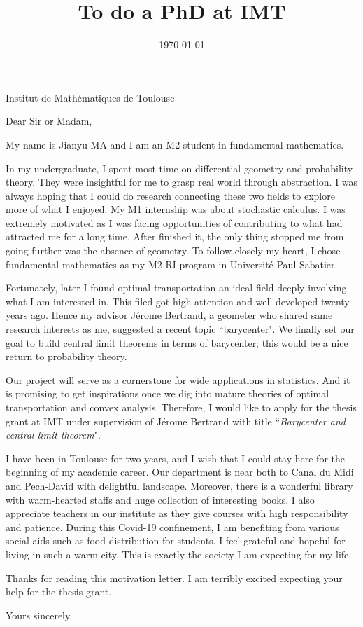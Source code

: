 \documentclass[11pt]{letter}
\title{To do a PhD at IMT}
\date{\today}
\begin{document}
\begin{letter}{Institut de Mathématiques de Toulouse}
	\opening{Dear Sir or Madam,}

	\setlength\parindent{1em}
	My name is Jianyu MA and I am an M2 student in fundamental mathematics.

	In my undergraduate, I spent most time on differential geometry and probability theory. They were insightful for me to grasp real world through abstraction. I was always hoping that I could do research connecting these two fields to explore more of what I enjoyed. My M1 internship was about stochastic calculus.
	I was extremely motivated as I was facing opportunities of contributing to what had attracted me for a long time.
	After finished it, the only thing stopped me from going further was the absence of geometry.
	To follow closely my heart, I chose fundamental mathematics as my M2 RI program in Université Paul Sabatier.

	Fortunately, later I found optimal transportation an ideal field deeply involving what I am interested in. This filed got high attention and well developed twenty years ago. Hence my advisor Jérome Bertrand, a geometer who shared same research interests as me, suggested a recent topic ``barycenter".
	We finally set our goal to build central limit theorems in terms of barycenter; this would be a nice return to probability theory.

	Our project will serve as a cornerstone for wide applications in statistics. And it is promising to get inspirations once we dig into mature theories of optimal transportation and convex analysis. Therefore, I would like to apply for the thesis grant at IMT under supervision of Jérome Bertrand with title ``\emph{Barycenter and central limit theorem}".

	I have been in Toulouse for two years, and I wish that I could stay here for the beginning of my academic career.
	Our department is near both to Canal du Midi and Pech-David with delightful landscape.
	Moreover, there is a wonderful library with  warm-hearted staffs and huge collection of interesting books.
	I also appreciate teachers in our institute as they give courses with high responsibility and patience.
	During this Covid-19 confinement, I am benefiting from various social aids such as food distribution for students.
	I feel grateful and hopeful for living in such a warm city.
	This is exactly the society I am expecting for my life.

	Thanks for reading this motivation letter. I am terribly excited expecting your help for the thesis grant.
	\closing{Yours sincerely,}
\end{letter}
\end{document}
